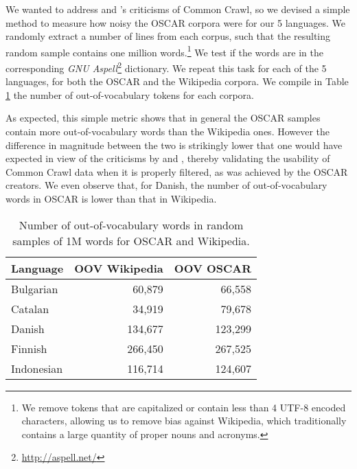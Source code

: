 We wanted to address \citep{trinh-le-2018-a} and \citep{radford-etal-2019-language}'s criticisms of Common Crawl, so we devised a simple method to measure how noisy the OSCAR corpora were for our 5 languages. We randomly extract a number of lines from each corpus, such that the resulting random sample contains one million words.\footnote{We remove tokens that are capitalized or contain less than 4 UTF-8 encoded characters, allowing us to remove bias against Wikipedia, which traditionally contains a large quantity of proper nouns and acronyms.} We test if the words are in the corresponding \emph{GNU Aspell}\footnote{\url{http://aspell.net/}} dictionary. We repeat this task for each of the 5 languages, for both the OSCAR and the Wikipedia corpora. We compile in Table \ref{tab:OOV} the number of out-of-vocabulary tokens for each corpora.

As expected, this simple metric shows that in general the OSCAR samples contain more out-of-vocabulary words than the Wikipedia ones. However the difference in magnitude between the two is strikingly lower that one would have expected in view of the criticisms by \citet{trinh-le-2018-a} and \citet{radford-etal-2019-language}, thereby validating the usability of Common Crawl data when it is properly filtered, as was achieved by the OSCAR creators. We even observe that, for Danish, the number of out-of-vocabulary words in OSCAR is lower than that in Wikipedia.

\begin{table}[t]
    \centering\small
    \begin{tabular}{lrr}\toprule
        Language   & \multicolumn{1}{l}{OOV Wikipedia} & \multicolumn{1}{l}{OOV OSCAR} \\ \midrule
        Bulgarian  & 60,879                            & 66,558                        \\
        Catalan    & 34,919                            & 79,678                        \\
        Danish     & 134,677                           & 123,299                       \\
        Finnish    & 266,450                           & 267,525                       \\
        Indonesian & 116,714                           & 124,607                       \\
        \bottomrule
    \end{tabular}
    \caption{Number of out-of-vocabulary words in random samples of 1M words for OSCAR and Wikipedia.}
    \label{tab:OOV}
\end{table}

